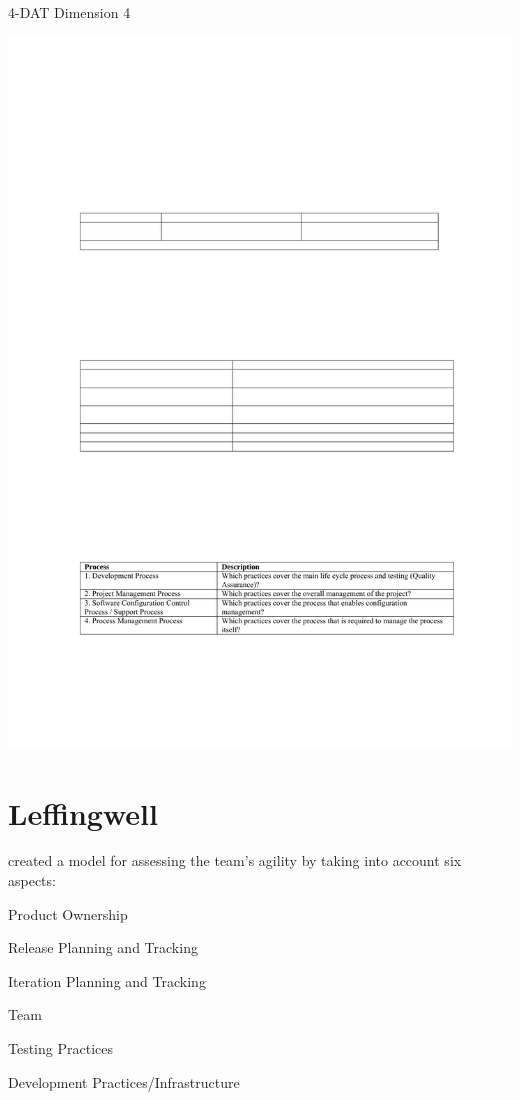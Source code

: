 \begin{table}[H]
\caption{4-DAT Dimension 4}
\label{fig:dimension4}
\centerline{\includegraphics[scale=0.8]{include/relatedwork/fig/qumer_dimension4.pdf}}
\end{table}


\section{Leffingwell} %
\citet{Leffingwell} created a model for assessing the team's agility by taking into account six aspects: 
\begin{inparaenum} [a\upshape)]
\item Product Ownership
\item Release Planning and Tracking
\item Iteration Planning and Tracking
\item Team
\item Testing Practices
\item Development Practices/Infrastructure
\end{inparaenum}


